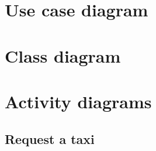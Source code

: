 \section{Use case diagram}
\begin{landscape}

\end{landscape}


\section{Class diagram}
\begin{landscape}
%
%
\end{landscape}\nopagebreak%
%
%
\section{Activity diagrams}
\subsection{Request a taxi}
\begin{figure}[H]
\centering
{}
\end{figure}


